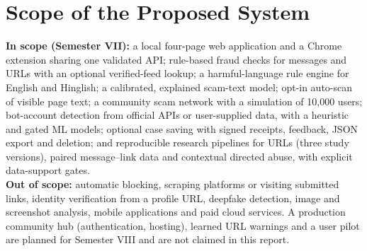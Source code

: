 \section{Scope of the Proposed System}
\noindent\textbf{In scope (Semester VII):} a local four-page web application and a Chrome extension sharing one validated API; rule-based fraud checks for messages and URLs with an optional verified-feed lookup; a harmful-language rule engine for English and Hinglish; a calibrated, explained scam-text model; opt-in auto-scan of visible page text; a community scam network with a simulation of 10,000 users; bot-account detection from official APIs or user-supplied data, with a heuristic and gated ML models; optional case saving with signed receipts, feedback, JSON export and deletion; and reproducible research pipelines for URLs (three study versions), paired message--link data and contextual directed abuse, with explicit data-support gates.\\

\noindent\textbf{Out of scope:} automatic blocking, scraping platforms or visiting submitted links, identity verification from a profile URL, deepfake detection, image and screenshot analysis, mobile applications and paid cloud services. A production community hub (authentication, hosting), learned URL warnings and a user pilot are planned for Semester VIII and are not claimed in this report.

